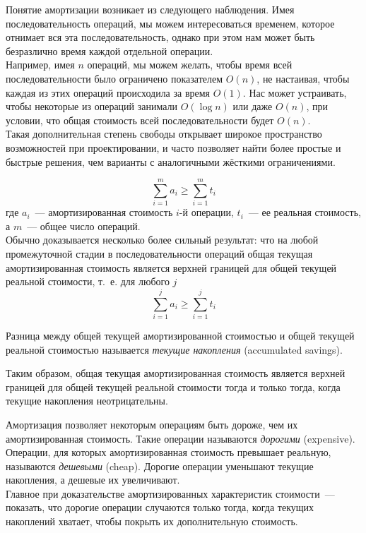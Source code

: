 \documentclass[aspectratio=169
  , xcolor={svgnames}
  , hyperref={ colorlinks,citecolor=DeepPink4
             , linkcolor=DarkRed,urlcolor=DarkBlue}
  , russian
  ]{beamer}
\newcommand{\term}[2]{\textit{#1} (#2)}
\theoremstyle{exerciseStyle1}
\begin{document}
\begin{frame}[fragile]{}
Понятие амортизации возникает из следующего наблюдения.  Имея
последовательность операций, мы можем интересоваться временем, которое
отнимает вся эта последовательность, однако при этом нам может быть
безразлично время каждой отдельной операции.\\

 Например, имея $n$
операций, мы можем желать, чтобы время всей последовательности было
ограничено показателем $O(n)$, не настаивая, чтобы каждая из этих
операций происходила за время $O(1)$. Нас может устраивать, чтобы
некоторые из операций занимали $O(\log n)$ или даже $O(n)$, при
условии, что общая стоимость всей последовательности будет
$O(n)$. \\

Такая дополнительная степень свободы открывает широкое
пространство возможностей при проектировании, и часто позволяет найти
более простые и быстрые решения, чем варианты с аналогичными жёсткими
ограничениями.

\end{frame}


\begin{frame}[fragile]{}
$$
\sum_{i=1}^m a_i \ge \sum_{i=1}^m t_i
$$
где $a_i$~--- амортизированная стоимость $i$-й операции, $t_i$~--- ее
реальная стоимость, а $m$~--- общее число операций.\\

 Обычно
доказывается несколько более сильный результат: что на любой
промежуточной стадии в последовательности операций общая текущая
амортизированная стоимость является верхней границей для общей текущей
реальной стоимости, т.~е. для любого $j$
$$
\sum_{i=1}^j a_i \ge \sum_{i=1}^j t_i
$$
\end{frame}


\begin{frame}[fragile]{}
\begin{definition}
Разница между общей текущей амортизированной стоимостью
и общей текущей реальной стоимостью называется
\term{текущие накопления}{accumulated savings}. 
\end{definition}
Таким образом, общая
текущая амортизированная стоимость является верхней границей для
общей текущей реальной стоимости тогда и только тогда, когда текущие
накопления неотрицательны.

\end{frame}


\begin{frame}[fragile]{}
Амортизация позволяет некоторым операциям быть дороже, чем их
амортизированная стоимость. Такие операции называются
\term{дорогими}{expensive}. Операции, для которых амортизированная
стоимость превышает реальную, называются
\term{дешевыми}{cheap}. Дорогие операции уменьшают текущие накопления,
а дешевые их увеличивают.\\

 Главное при доказательстве
амортизированных характеристик стоимости~--- показать, что дорогие
операции случаются только тогда, когда текущих накоплений хватает,
чтобы покрыть их дополнительную стоимость.
\end{frame}
\end{document}
